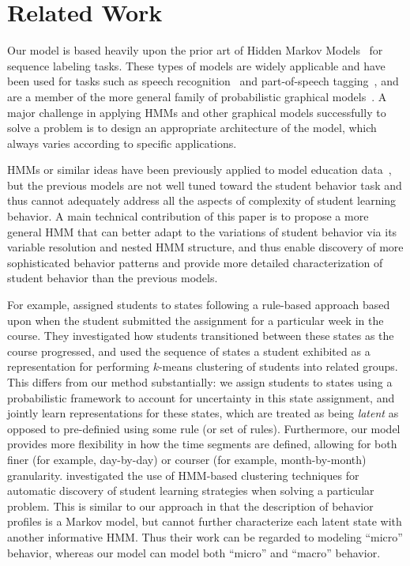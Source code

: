 \section{Related Work}

Our model is based heavily upon the prior art of Hidden Markov
Models~\cite{Rabiner:1990:RSR} for sequence labeling tasks. These types of
models are widely applicable and have been used for tasks such as speech
recognition~\cite{Huang:1990:HMM} and part-of-speech
tagging~\cite{Jurafsky:2009:SLP}, and are a member of the more general
family of probabilistic graphical models~\cite{Koller:2009:PGM}.
A major challenge in applying HMMs and other graphical models successfully to
solve a problem is to design an appropriate architecture of the model, which
always varies according to specific applications.

HMMs or similar ideas have been previously 
applied to model education data~\cite{Shih:2010:EDM,Kizilcec:2013:LAK}, but the previous models are not well tuned toward the student behavior task and thus cannot
adequately address all the aspects of complexity of student learning behavior. 
A main technical contribution of this paper is to propose a more general
HMM that can better adapt to the variations of student behavior via its variable resolution
and nested HMM structure, and thus enable discovery of more sophisticated behavior patterns and provide more detailed characterization of student behavior than the previous models.
 
For example, \citet{Kizilcec:2013:LAK} assigned students to states following a rule-based
approach based upon when the student submitted the assignment for a
particular week in the course. They investigated how students transitioned
between these states as the course progressed, and used the sequence of
states a student exhibited as a representation for performing $k$-means
clustering of students into related groups. This differs from our method
substantially: we assign students to states using a probabilistic
framework to account for uncertainty in this state assignment, and jointly
learn representations for these states, which are treated as being
\emph{latent} as opposed to pre-definied using some rule (or set of rules).
Furthermore, our model provides more flexibility in how the time segments
are defined, allowing for both finer (for example, day-by-day) or courser
(for example, month-by-month) granularity. \citet{Shih:2010:EDM} investigated the use of HMM-based clustering
techniques for automatic discovery of student learning strategies when
solving a particular problem. This is similar to our approach in that the
description of behavior profiles is a Markov model, but cannot further characterize
each latent state with another informative HMM. Thus their work can be regarded
to modeling ``micro'' behavior, whereas our model can model both ``micro'' and ``macro'' behavior. 

